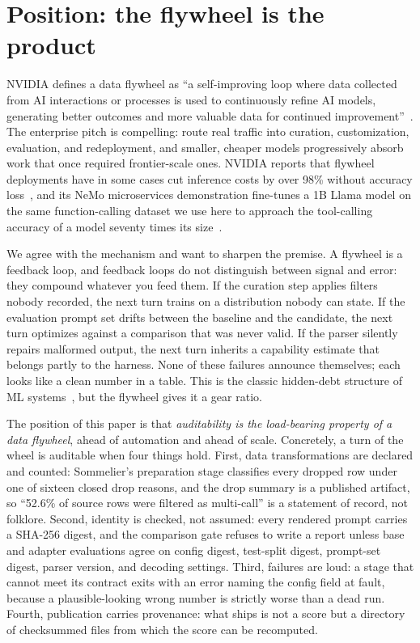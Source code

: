 \documentclass{article}
\newcommand{\sommelier}{Sommelier}
\begin{document}
\section{Position: the flywheel is the product}
\label{sec:flywheel}

NVIDIA defines a data flywheel as ``a self-improving loop where data collected from AI interactions or processes is used to continuously refine AI models, generating better outcomes and more valuable data for continued improvement''~\citep{nvidia2026flywheel}. The enterprise pitch is compelling: route real traffic into curation, customization, evaluation, and redeployment, and smaller, cheaper models progressively absorb work that once required frontier-scale ones. NVIDIA reports that flywheel deployments have in some cases cut inference costs by over 98\% without accuracy loss~\citep{nvidia2026flywheel}, and its NeMo microservices demonstration fine-tunes a 1B Llama model on the same function-calling dataset we use here to approach the tool-calling accuracy of a model seventy times its size~\citep{verma2025flywheel}.

We agree with the mechanism and want to sharpen the premise. A flywheel is a feedback loop, and feedback loops do not distinguish between signal and error: they compound whatever you feed them. If the curation step applies filters nobody recorded, the next turn trains on a distribution nobody can state. If the evaluation prompt set drifts between the baseline and the candidate, the next turn optimizes against a comparison that was never valid. If the parser silently repairs malformed output, the next turn inherits a capability estimate that belongs partly to the harness. None of these failures announce themselves; each looks like a clean number in a table. This is the classic hidden-debt structure of ML systems~\citep{sculley2015hidden}, but the flywheel gives it a gear ratio.

The position of this paper is that \emph{auditability is the load-bearing property of a data flywheel}, ahead of automation and ahead of scale. Concretely, a turn of the wheel is auditable when four things hold. First, data transformations are declared and counted: \sommelier's preparation stage classifies every dropped row under one of sixteen closed drop reasons, and the drop summary is a published artifact, so ``52.6\% of source rows were filtered as multi-call'' is a statement of record, not folklore. Second, identity is checked, not assumed: every rendered prompt carries a SHA-256 digest, and the comparison gate refuses to write a report unless base and adapter evaluations agree on config digest, test-split digest, prompt-set digest, parser version, and decoding settings. Third, failures are loud: a stage that cannot meet its contract exits with an error naming the config field at fault, because a plausible-looking wrong number is strictly worse than a dead run. Fourth, publication carries provenance: what ships is not a score but a directory of checksummed files from which the score can be recomputed.
\end{document}
